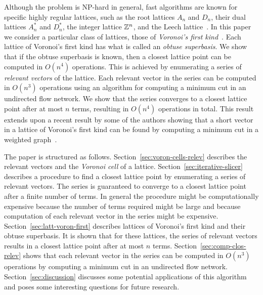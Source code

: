 \documentclass[final,leqno]{siamltex}
\begin{document}
Although the problem is NP-hard in general, fast algorithms are known for specific highly regular lattices, such as the root lattices $A_n$ and $D_n$, their dual lattices $A_n^*$ and $D_n^*$, the integer lattice ${\mathbb Z}^{n}$, and the Leech lattice~\cite[Chap. 4]{SPLAG}\cite{Conway1982FastQuantDec,Conway1986SoftDecLeechGolay, Clarkson1999:Anstar, McKilliam2008, McKilliam2008b, McKilliam2009CoxeterLattices,Vardy1993_leech_lattice_MLD}.  In this paper we consider a particular class of lattices, those of \emph{Voronoi's first kind}~\cite{ConwaySloane1992_voronoi_lattice_3d_obtuse_superbases,Valentin2003_coverings_tilings_low_dimension,Voronoi1908_main_paper}.  Each lattice of Voronoi's first kind has what is called an \emph{obtuse superbasis}.  We show that if the obtuse superbasis is known, then a closest lattice point can be computed in $O(n^4)$ operations.  This is achieved by enumerating a series of \emph{relevant vectors} of the lattice.  Each relevant vector in the series can be computed in $O(n^3)$ operations using an algorithm for computing a minimum cut in an undirected flow network.  We show that the series converges to a closest lattice point after at most $n$ terms, resulting in $O(n^4)$ operations in total.  This result extends upon a recent result by some of the authors showing that a short vector in a lattice of Voronoi's first kind can be found by computing a minimum cut in a weighted graph~\cite{McKilliam_short_vectors_first_type_isit_2012}.

The paper is structured as follows.  Section~\ref{sec:voron-cells-relev} describes the relevant vectors and the \emph{Voronoi cell} of a lattice. Section~\ref{sec:iterative-slicer} describes a procedure to find a closest lattice point by enumerating a series of relevant vectors.  The series is guaranteed to converge to a closest lattice point after a finite number of terms.  In general the procedure might be computationally expensive because the number of terms required might be large and because computation of each relevant vector in the series might be expensive.  Section~\ref{sec:latt-voron-first} describes lattices of Voronoi's first kind and their obtuse superbasis.  It is shown that for these lattices, the series of relevant vectors results in a closest lattice point after at most $n$ terms.  Section~\ref{sec:comp-clos-relev} shows that each relevant vector in the series can be computed in $O(n^3)$ operations by computing a minimum cut in an undirected flow network.  Section~\ref{sec:discussion} discusses some potential applications of this algorithm and poses some interesting questions for future research.
\end{document}
